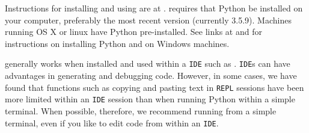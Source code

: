 Instructions for installing and using \mpfshell are at . 
\mpfshell requires that Python be installed on your computer, preferably the most recent version (currently 3.5.9). 
Machines running OS X or linux have Python pre-installed. 
See links at  and  for instructions on installing Python and \mpfshell on Windows machines.
\begin{kaobox}[frametitle=Using \mpfshell in \htmladdnormallink{Integrated Development Environments}{https://en.wikipedia.org/wiki/Integrated_development_environment}  (\texttt{IDE}s)]
	\mpfshell generally works when installed and used within a \python \texttt{IDE} such as . 
	\python \texttt{IDE}s can have advantages in generating and debugging code. 
	However, in some cases, we have found that functions such as copying and pasting text in \texttt{REPL} sessions have been more limited within an \texttt{IDE} session than when running Python within a simple terminal. 
	When possible, therefore, we recommend running \mpfshell from a simple terminal, even if you like to edit code from within an \texttt{IDE}. 
\end{kaobox}


